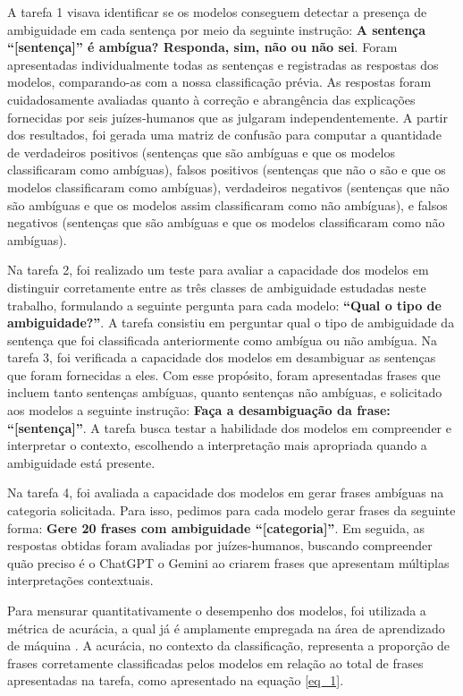 A tarefa 1 visava identificar se os modelos conseguem detectar a presença de ambiguidade em cada sentença por meio da seguinte instrução: \textbf{A sentença ``[sentença]'' é ambígua? Responda, sim, não ou não sei}. Foram apresentadas individualmente todas as sentenças e registradas as respostas dos modelos, comparando-as com a nossa classificação prévia. As respostas foram cuidadosamente avaliadas quanto à correção e abrangência das explicações fornecidas por seis juízes-humanos que as julgaram independentemente. A partir dos resultados, foi gerada uma matriz de confusão para computar a quantidade de verdadeiros positivos (sentenças que são ambíguas e que os modelos classificaram como ambíguas), falsos positivos (sentenças que não o são e que os modelos classificaram como ambíguas), verdadeiros negativos (sentenças que não são ambíguas e que os modelos assim classificaram como não ambíguas), e falsos negativos (sentenças que são ambíguas e que os modelos classificaram como não ambíguas).


Na tarefa 2, foi realizado um teste para avaliar a capacidade dos modelos em distinguir corretamente entre as três classes de ambiguidade estudadas neste trabalho, formulando a seguinte pergunta para cada modelo: \textbf{``Qual o tipo de ambiguidade?''}. A tarefa consistiu em perguntar qual o tipo de ambiguidade da sentença que foi classificada anteriormente como ambígua ou não ambígua. Na tarefa 3, foi verificada a capacidade dos modelos em desambiguar as sentenças que foram fornecidas a eles. Com esse propósito, foram apresentadas frases que incluem tanto sentenças ambíguas, quanto sentenças não ambíguas, e solicitado aos modelos a seguinte instrução: \textbf{Faça a desambiguação da frase: ``[sentença]''}. A tarefa busca testar a habilidade dos modelos em compreender e interpretar o contexto, escolhendo a interpretação mais apropriada quando a ambiguidade está presente. 

Na tarefa 4, foi avaliada a capacidade dos modelos em gerar frases ambíguas na categoria solicitada. Para isso, pedimos para cada modelo gerar frases da seguinte forma: \textbf{Gere 20 frases com ambiguidade ``[categoria]''}. Em seguida, as respostas obtidas foram avaliadas por juízes-humanos, buscando compreender quão preciso é o ChatGPT o Gemini ao criarem frases que apresentam múltiplas interpretações contextuais.

Para mensurar quantitativamente o desempenho dos modelos, foi utilizada a métrica de acurácia, a qual já é amplamente empregada na área de aprendizado de máquina  \cite{naser2021error, freitag2021funccao}. A acurácia, no contexto da classificação, representa a proporção de frases corretamente classificadas pelos modelos em relação ao total de frases apresentadas na tarefa, como apresentado na equação \ref{eq_1}.

